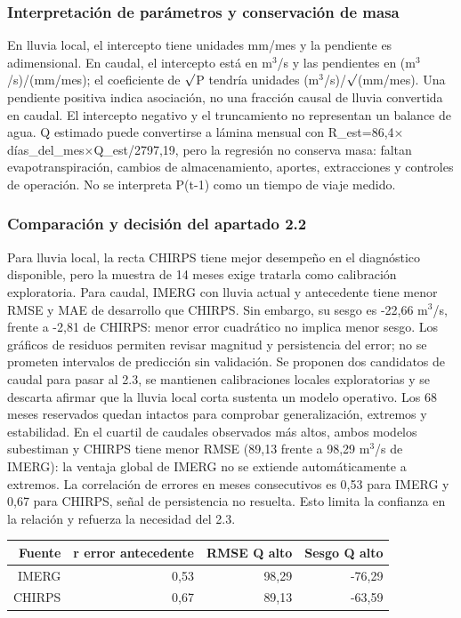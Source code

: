 \documentclass[10pt,a4paper]{article}
\begin{document}
\subsubsection*{Interpretación de parámetros y conservación de masa}
En lluvia local, el intercepto tiene unidades mm/mes y la pendiente es adimensional. En caudal, el intercepto está en m$^3$/s y las pendientes en (m$^3$/s)/(mm/mes); el coeficiente de $\sqrt{\vphantom{P}}$P tendría unidades (m$^3$/s)/$\sqrt{\vphantom{P}}$(mm/mes). Una pendiente positiva indica asociación, no una fracción causal de lluvia convertida en caudal. El intercepto negativo y el truncamiento no representan un balance de agua. Q estimado puede convertirse a lámina mensual con R\_est=86,4$\times$días\_del\_mes$\times$Q\_est/2797,19, pero la regresión no conserva masa: faltan evapotranspiración, cambios de almacenamiento, aportes, extracciones y controles de operación. No se interpreta P(t-1) como un tiempo de viaje medido.
\subsubsection*{Comparación y decisión del apartado 2.2}
Para lluvia local, la recta CHIRPS tiene mejor desempeño en el diagnóstico disponible, pero la muestra de 14 meses exige tratarla como calibración exploratoria. Para caudal, IMERG con lluvia actual y antecedente tiene menor RMSE y MAE de desarrollo que CHIRPS. Sin embargo, su sesgo es -22,66 m$^3$/s, frente a -2,81 de CHIRPS: menor error cuadrático no implica menor sesgo. Los gráficos de residuos permiten revisar magnitud y persistencia del error; no se prometen intervalos de predicción sin validación. Se proponen dos candidatos de caudal para pasar al 2.3, se mantienen calibraciones locales exploratorias y se descarta afirmar que la lluvia local corta sustenta un modelo operativo. Los 68 meses reservados quedan intactos para comprobar generalización, extremos y estabilidad. En el cuartil de caudales observados más altos, ambos modelos subestiman y CHIRPS tiene menor RMSE (89,13 frente a 98,29 m$^3$/s de IMERG): la ventaja global de IMERG no se extiende automáticamente a extremos. La correlación de errores en meses consecutivos es 0,53 para IMERG y 0,67 para CHIRPS, señal de persistencia no resuelta. Esto limita la confianza en la relación y refuerza la necesidad del 2.3.
\begin{center}\small\begin{tabular}{rrrr}\hline
Fuente & r error antecedente & RMSE Q alto & Sesgo Q alto \\ \hline
IMERG & 0,53 & 98,29 & -76,29 \\
CHIRPS & 0,67 & 89,13 & -63,59 \\
\hline\end{tabular}\end{center}
\end{document}
